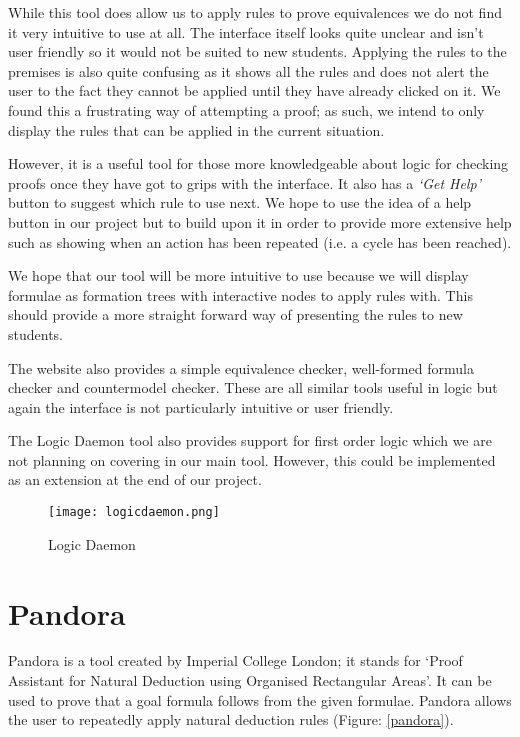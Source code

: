 \documentclass{report}
\begin{document}
While this tool does allow us to apply rules to prove equivalences we do not find it very intuitive to use at all. The interface itself looks quite unclear and isn't user friendly so it would not be suited to new students. Applying the rules to the premises is also quite confusing as it shows all the rules and does not alert the user to the fact they cannot be applied until they have already clicked on it. We found this a frustrating way of attempting a proof; as such, we intend to only display the rules that can be applied in the current situation.

However, it is a useful tool for those more knowledgeable about logic for checking proofs once they have got to grips with the interface. It also has a \textit{`Get Help'} button to suggest which rule to use next. We hope to use the idea of a help button in our project but to build upon it in order to provide more extensive help such as showing when an action has been repeated (i.e. a cycle has been reached).

We hope that our tool will be more intuitive to use because we will display formulae as formation trees with interactive nodes to apply rules with. This should provide a more straight forward way of presenting the rules to new students.

The website also provides a simple equivalence checker, well-formed formula checker and countermodel checker. These are all similar tools useful in logic but again the interface is not particularly intuitive or user friendly.

The Logic Daemon tool also provides support for first order logic which we are not planning on covering in our main tool. However, this could be implemented as an extension at the end of our project.

\begin{figure}[ht]
    \centering
    \texttt{[image: logicdaemon.png]}
    \caption{Logic Daemon}
    \label{logicdaemon}
\end{figure}

\section{Pandora}

Pandora\cite{pandora} is a tool created by Imperial College London; it stands for `Proof Assistant for Natural Deduction using Organised Rectangular Areas'. It can be used to prove that a goal formula follows from the given formulae. Pandora allows the user to repeatedly apply natural deduction rules (Figure: \ref{pandora}).
\end{document}
